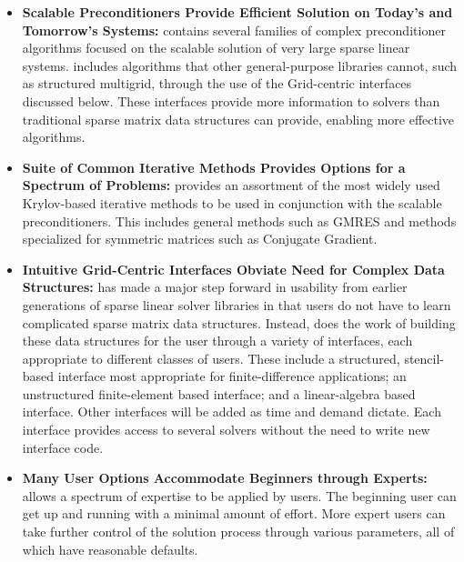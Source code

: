 \begin{itemize}

\item
{\bf Scalable Preconditioners Provide Efficient Solution on Today's and Tomorrow's
Systems:} \hypre{} 
contains several families of complex preconditioner algorithms focused on the
scalable solution of very 
large sparse linear systems. \hypre{} includes algorithms that other
general-purpose libraries cannot, such as 
structured multigrid, through the use of the Grid-centric interfaces discussed
below. These interfaces 
provide more information to solvers than traditional sparse matrix data
structures can provide, enabling 
more effective algorithms.

\item
{\bf Suite of Common Iterative Methods Provides Options for a Spectrum of Problems:}
\hypre{} provides 
an assortment of the most widely used Krylov-based iterative methods to be used
in conjunction with the 
scalable preconditioners. This includes general methods such as GMRES and
methods specialized for 
symmetric matrices such as Conjugate Gradient.

\item
{\bf Intuitive Grid-Centric Interfaces Obviate Need for Complex Data Structures:}
\hypre{} has made a 
major step forward in usability from earlier generations of sparse linear
solver libraries in that users do not 
have to learn complicated sparse matrix data structures. Instead, \hypre{} does
the work of building these 
data structures for the user through a variety of interfaces, each appropriate
to different classes of users. 
These include a structured, stencil-based interface most appropriate for
finite-difference applications; an 
unstructured finite-element based interface; and a linear-algebra based
interface. Other interfaces will be 
added as time and demand dictate.
Each interface provides access to several solvers without the need to
write new interface code.

\item
{\bf Many User Options Accommodate Beginners through Experts:} \hypre{} allows a
spectrum of expertise 
to be applied by users. The beginning user can get up and running with a
minimal amount of effort. More expert users can take further
control of the solution process 
through various parameters, all of which have reasonable defaults. 


\end{itemize}
